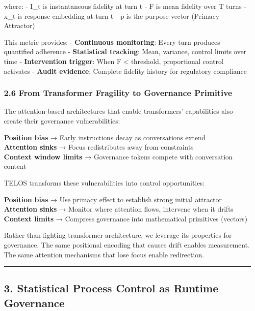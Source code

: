 where: - I\_t is instantaneous fidelity at turn t - F is mean fidelity
over T turns - x\_t is response embedding at turn t - p is the purpose
vector (Primacy Attractor)

This metric provides: - \textbf{Continuous monitoring}: Every turn
produces quantified adherence - \textbf{Statistical tracking}: Mean,
variance, control limits over time - \textbf{Intervention trigger}: When
F \textless{} threshold, proportional control activates - \textbf{Audit
evidence}: Complete fidelity history for regulatory compliance

\subsubsection{2.6 From Transformer Fragility to Governance
Primitive}\label{from-transformer-fragility-to-governance-primitive}

The attention-based architectures that enable transformers' capabilities
also create their governance vulnerabilities:

\textbf{Position bias} → Early instructions decay as conversations
extend\\
\textbf{Attention sinks} → Focus redistributes away from constraints\\
\textbf{Context window limits} → Governance tokens compete with
conversation content

TELOS transforms these vulnerabilities into control opportunities:

\textbf{Position bias} → Use primacy effect to establish strong initial
attractor\\
\textbf{Attention sinks} → Monitor where attention flows, intervene when
it drifts\\
\textbf{Context limits} → Compress governance into mathematical
primitives (vectors)

Rather than fighting transformer architecture, we leverage its
properties for governance. The same positional encoding that causes
drift enables measurement. The same attention mechanisms that lose focus
enable redirection.

\begin{center}\rule{0.5\linewidth}{0.5pt}\end{center}

\subsection{3. Statistical Process Control as Runtime
Governance}\label{statistical-process-control-as-runtime-governance}

